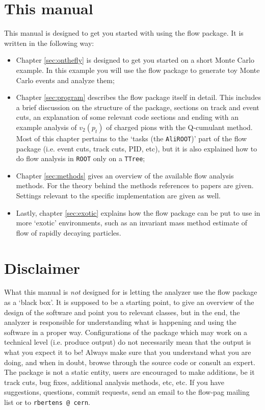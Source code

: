 \documentclass[a4paper]{book}
\numberwithin{equation}{subsection}
\begin{document}
\section{This manual}
This manual is designed to get you started with using the flow package. It is written in the following way:
\begin{itemize}
    \item Chapter \ref{sec:onthefly} is designed to get you started on a short Monte Carlo example. In this example you will use the flow package to generate toy Monte Carlo events and analyze them;
    \item Chapter \ref{sec:program} describes the flow package itself in detail. This includes a brief discussion on the structure of the package, sections on track and event cuts, an explanation of some relevant code sections and ending with an example analysis of $v_2(p_t)$ of charged pions with the Q-cumulant method. Most of this chapter pertains to the `tasks (the \texttt{AliROOT})' part of the flow package (i.e. event cuts, track cuts, PID, etc), but it is also explained how to do flow analysis in \texttt{ROOT} only on a \texttt{TTree};
    \item Chapter \ref{sec:methods} gives an overview of the available flow analysis methods. For the theory behind the methods references to papers are given. Settings relevant to the specific implementation are given as well. 
    \item Lastly, chapter \ref{sec:exotic} explains how the flow package can be put to use in more `exotic' environments, such as an invariant mass method estimate of flow of rapidly decaying particles. 
    \end{itemize}
\section{Disclaimer}
What this manual is \emph{not} designed for is letting the analyzer use the flow package as a `black box'. It is supposed to be a starting point, to give an overview of the design of the software and point you to relevant classes, but in the end, the analyzer is responsible for understanding what is happening and using the software in a proper way. Configurations of the package which may work on a technical level (i.e. produce output) do not necessarily mean that the output is what you expect it to be! Always make sure that you understand what you are doing, and when in doubt, browse through the source code or consult an expert. The package is not a static entity, users are encouraged to make additions, be it track cuts, bug fixes, additional analysis methods, etc, etc. If you have suggestions, questions, commit requests, send an email to the flow-pag mailing list or to \texttt{rbertens @ cern}. 
\end{document}
